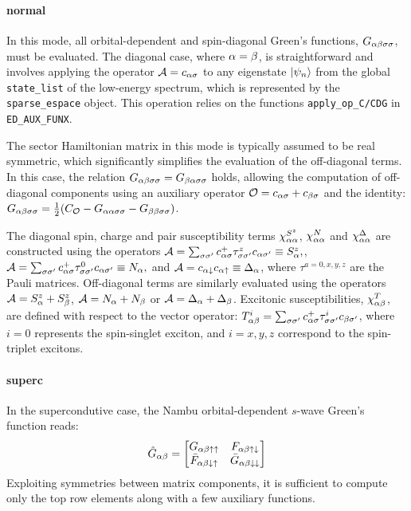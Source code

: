 \documentclass[edipack2.tex]{subfiles}
\begin{document}
\paragraph{{\bf normal}}
In this mode, all orbital-dependent and spin-diagonal Green's 
functions, $G_{\alpha\beta\sigma\sigma}$, must be evaluated. The diagonal 
case, where $\alpha=\beta$, is straightforward and involves applying 
the operator ${\cal A}=c_{\alpha\sigma}$ to any eigenstate $|\psi_n\rangle$ 
from the global {\tt state\_list} of the low-energy spectrum, 
which is represented by the {\tt sparse\_espace} object. This 
operation relies on the functions {\tt apply\_op\_C/CDG} in 
{\tt ED\_AUX\_FUNX}. 



The sector Hamiltonian matrix in this mode is typically assumed 
to be real symmetric, which significantly simplifies the evaluation 
of the off-diagonal terms. In this case, the relation 
$G_{\alpha\beta\sigma\sigma}=G_{\beta\alpha\sigma\sigma}$ holds, allowing the computation of 
off-diagonal components using an auxiliary operator 
${\cal O} = c_{\alpha\sigma} + c_{\beta\sigma}$ and the identity:
$G_{\alpha\beta\sigma\sigma}=\tfrac{1}{2}(C_{\cal O} - G_{\alpha\alpha\sigma\sigma} - G_{\beta\beta\sigma\sigma})$.

The diagonal spin, charge and pair susceptibility terms
$\chi^{S^z}_{\alpha\alpha}$, $\chi^N_{\alpha\alpha}$ and $\chi^\Delta_{\alpha\alpha}$
are constructed using the operators ${\cal A} = \sum_{\sigma\sigma'} c^+_{\alpha\sigma}
\tau^z_{\sigma\sigma'} c_{\alpha\sigma'} \equiv S^z_\alpha, $, 
${\cal A} = \sum_{\sigma\sigma'} c^+_{\alpha\sigma} \tau^0_{\sigma\sigma'} c_{\alpha\sigma'} \equiv N_\alpha, $
and ${\cal A} = c_{\alpha\downarrow}c_{\alpha\uparrow} \equiv \Delta_\alpha$,
where $\tau^{a=0,x,y,z}$ are the Pauli matrices.
Off-diagonal terms are similarly evaluated using the operators
${\cal A}=S^z_\alpha + S^z_\beta$, ${\cal A}=N_\alpha + N_\beta$ or ${\cal A}=\Delta_\alpha + \Delta_\beta$. 
Excitonic susceptibilities, $\chi^T_{\alpha\beta}$, are defined with 
respect to the vector operator: $T^i_{\alpha\beta} = \sum_{\sigma\sigma'}
c^+_{\alpha\sigma}\tau^i_{\sigma\sigma'}c_{\beta\sigma'}$, where $i=0$ represents the
spin-singlet exciton, and $i=x,y,z$  correspond to the spin-triplet excitons.


\paragraph{{\bf superc}}
In the supercondutive case, the Nambu orbital-dependent $s$-wave
Green's function reads:
\begin{equation}
  \label{GFnambu}
  \hat{G}_{\alpha\beta} =
  \begin{bmatrix}
    G_{\alpha\beta\uparrow\uparrow} & F_{\alpha\beta\uparrow\downarrow} \\
    \bar{F}_{\alpha\beta\downarrow\uparrow} & \bar{G}_{\alpha\beta\downarrow\downarrow}
  \end{bmatrix}  
\end{equation}
Exploiting symmetries between matrix components, it is 
sufficient to compute only the top row elements along with 
a few auxiliary functions.
\end{document}
